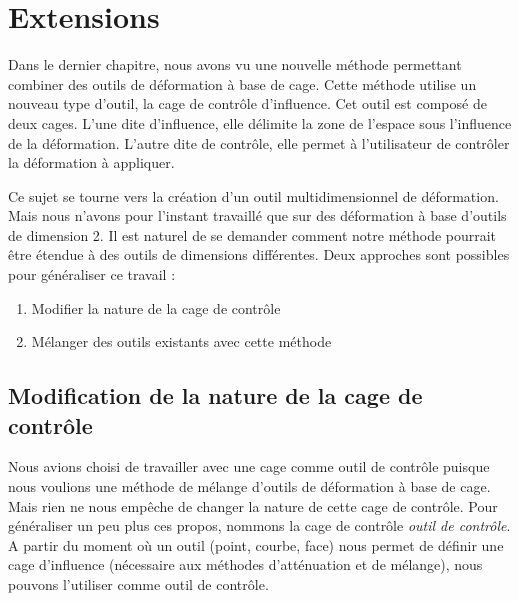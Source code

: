 

\chapter{Extensions}

\graphicspath{ {Chapter4/Chapter4Figs/PNG/}
  {Chapter4/Chapter4Figs/PDF/} {Chapter4/Chapter4Figs/} }

Dans le dernier chapitre, nous avons vu une nouvelle méthode permettant
combiner des outils de déformation à base de cage. Cette méthode utilise un
nouveau type d'outil, la cage de contrôle d'influence. Cet outil est composé
de deux cages. L'une dite d'influence, elle délimite la zone de l'espace
sous l'influence de la déformation. L'autre dite de contrôle, elle permet à
l'utilisateur de contrôler la déformation à appliquer.

Ce sujet se tourne vers la création d'un outil multidimensionnel de
déformation. Mais nous n'avons pour l'instant travaillé que sur des
déformation à base d'outils de dimension 2. Il est naturel de se demander
comment notre méthode pourrait être étendue à des outils de dimensions
différentes. Deux approches sont possibles pour généraliser ce travail :

\begin{enumerate}
\item Modifier la nature de la cage de contrôle
\item Mélanger des outils existants avec cette méthode
\end{enumerate}

\section{Modification de la nature de la cage de contrôle}

Nous avions choisi de travailler avec une cage comme outil de contrôle puisque
nous voulions une méthode de mélange d'outils de déformation à base de cage.
Mais rien ne nous empêche de changer la nature de cette cage de contrôle. Pour
généraliser un peu plus ces propos, nommons la cage de contrôle \textit{outil
de contrôle}. A partir du moment où un outil (point, courbe, face) nous permet
de définir une cage d'influence (nécessaire aux méthodes d'atténuation et de
mélange), nous pouvons l'utiliser comme outil de contrôle.

